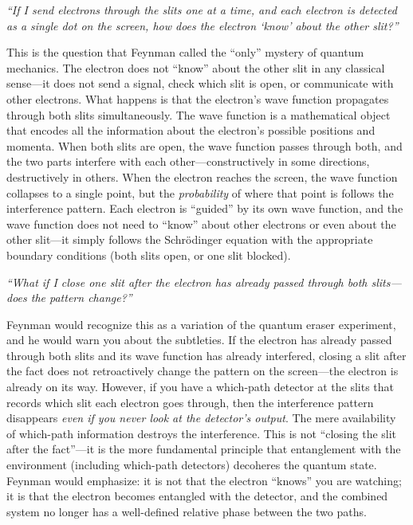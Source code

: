 \documentclass[11pt,openright]{book}
\begin{document}
\textit{``If I send electrons through the slits one at a time, and each electron is detected as a single dot on the screen, how does the electron `know' about the other slit?''}

This is the question that Feynman called the ``only'' mystery of quantum mechanics. The electron does not ``know'' about the other slit in any classical sense---it does not send a signal, check which slit is open, or communicate with other electrons. What happens is that the electron's wave function propagates through both slits simultaneously. The wave function is a mathematical object that encodes all the information about the electron's possible positions and momenta. When both slits are open, the wave function passes through both, and the two parts interfere with each other---constructively in some directions, destructively in others. When the electron reaches the screen, the wave function collapses to a single point, but the \emph{probability} of where that point is follows the interference pattern. Each electron is ``guided'' by its own wave function, and the wave function does not need to ``know'' about other electrons or even about the other slit---it simply follows the Schrödinger equation with the appropriate boundary conditions (both slits open, or one slit blocked).

\textit{``What if I close one slit after the electron has already passed through both slits---does the pattern change?''}

Feynman would recognize this as a variation of the quantum eraser experiment, and he would warn you about the subtleties. If the electron has already passed through both slits and its wave function has already interfered, closing a slit after the fact does not retroactively change the pattern on the screen---the electron is already on its way. However, if you have a which-path detector at the slits that records which slit each electron goes through, then the interference pattern disappears \emph{even if you never look at the detector's output}. The mere availability of which-path information destroys the interference. This is not ``closing the slit after the fact''---it is the more fundamental principle that entanglement with the environment (including which-path detectors) decoheres the quantum state. Feynman would emphasize: it is not that the electron ``knows'' you are watching; it is that the electron becomes entangled with the detector, and the combined system no longer has a well-defined relative phase between the two paths.
\end{document}
